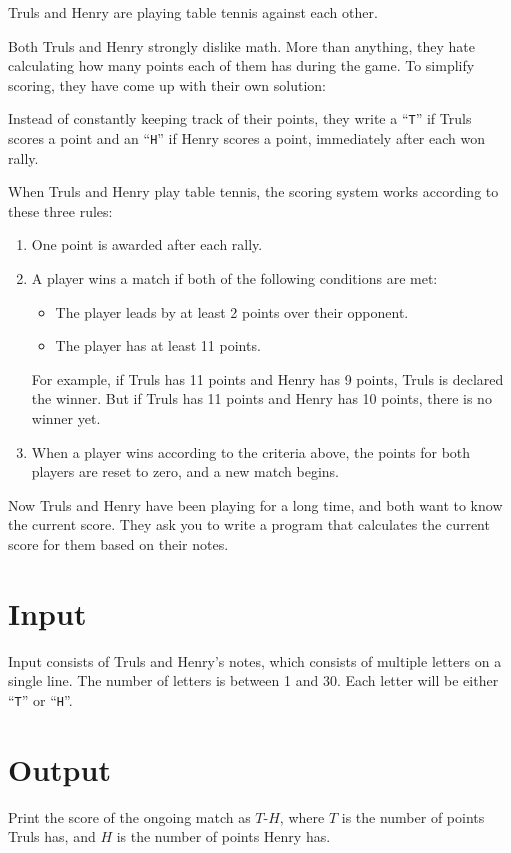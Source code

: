 
Truls and Henry are playing table tennis against each other.

Both Truls and Henry strongly dislike math.  
More than anything, they hate calculating how many points each of them has during the game.  
To simplify scoring, they have come up with their own solution:

Instead of constantly keeping track of their points, they write a ``\texttt{T}'' if Truls
scores a point and an ``\texttt{H}'' if Henry scores a point, immediately after each won rally.

When Truls and Henry play table tennis, the scoring system works according to these three rules:  
\begin{enumerate}
  \item One point is awarded after each rally.  
  \item A player wins a match if both of the following conditions are met:  
  \begin{itemize}
    \item The player leads by at least 2 points over their opponent.  
    \item The player has at least 11 points.  
  \end{itemize}  
  For example, if Truls has 11 points and Henry has 9 points, Truls is declared the winner.
  But if Truls has 11 points and Henry has 10 points, there is no winner yet.  

  \item When a player wins according to the criteria above, the points for both players are reset to
  zero, and a new match begins.  
\end{enumerate}  

Now Truls and Henry have been playing for a long time, and both want to know the current score.  
They ask you to write a program that calculates the current score for them based on their notes.

\section*{Input}
Input consists of Truls and Henry's notes, which consists of multiple letters on a single line.
The number of letters is between 1 and 30.  
Each letter will be either ``\texttt{T}'' or ``\texttt{H}''.

\section*{Output}
Print the score of the ongoing match as $T$-$H$, where $T$ is
the number of points Truls has, and $H$ is the number of points Henry has.

